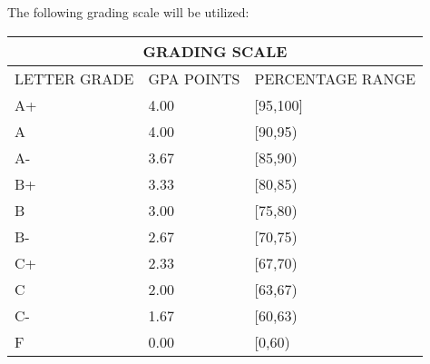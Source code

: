 \documentclass[a4paper]{article}
\begin{document}
The following grading scale will be utilized:
\begin{table}[h!]
	\centering
	\begin{tabular}{|l|l|l|}
		\hline
		\multicolumn{3}{c}{GRADING SCALE}\\
		\hline 
		LETTER GRADE & GPA POINTS & PERCENTAGE RANGE \\
		\hline
		A+ & 4.00 & [95,100] \\
		\hline
		A & 4.00 & [90,95) \\
		\hline
		A- & 3.67 & [85,90) \\
		\hline
		B+ & 3.33 & [80,85) \\
		\hline
		B & 3.00 & [75,80) \\
		\hline
		B- & 2.67 & [70,75) \\
		\hline
		C+ & 2.33 & [67,70) \\
		\hline
		C & 2.00 & [63,67) \\
		\hline
		C- & 1.67 & [60,63) \\
		\hline
		F & 0.00 & [0,60) \\
		\hline
	\end{tabular}
\end{table}

\end{document}
